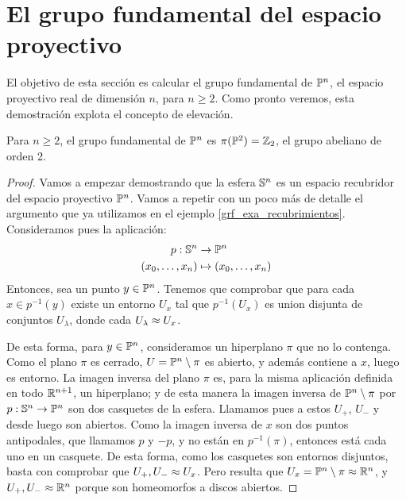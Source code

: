 
\section{El grupo fundamental del espacio proyectivo}

El objetivo de esta sección es calcular el grupo fundamental de $\mathbb{P}^n$, el espacio proyectivo real de dimensión $n$, para $n\geq 2$. Como pronto veremos, esta demostración explota el concepto de elevación. 

\begin{theo}
	\label{grf_espacio_proyectivo}
	
	Para $n\geq 2$, el grupo fundamental de  $\mathbb{P}^n$ es $\pi(\mathbb{P}^2)=\mathbb{Z}_2$, el grupo abeliano de orden 2.
	
	\begin{proof}
		Vamos a empezar demostrando que la esfera $\mathbb{S}^n$ es un espacio recubridor del espacio proyectivo $\mathbb{P}^n$. Vamos a repetir con un poco más de detalle el argumento que ya utilizamos en el ejemplo \ref{grf_exa_recubrimientos}. Consideramos pues la aplicación:
		\[\begin{split}
		p:\mathbb{S}^n&\to\mathbb{P}^n \\
		(x_0,\dots,x_n)&\mapsto (x_0,\dotsc,x_n)
		\end{split}\]
		Entonces, sea un punto $y\in\mathbb{P}^n$. Tenemos que comprobar que para cada $x\in p^{-1}(y)$ existe un entorno $U_x$ tal que $p^{-1}(U_x)$ es union disjunta de conjuntos $U_\lambda$, donde cada $U_\lambda\approx U_x$.
		
		De esta forma, para $y\in\mathbb{P}^n$, consideramos un hiperplano $\pi$ que no lo contenga. Como el plano $\pi$ es cerrado, $U=\mathbb{P}^n\setminus\pi$ es abierto, y además contiene a $x$, luego es entorno. La imagen inversa del plano $\pi$ es, para la misma aplicación definida en todo $\mathbb{R}^{n+1}$, un hiperplano; y de esta manera la imagen inversa de $\mathbb{P}^n\setminus\pi$ por $p:\mathbb{S}^n\to\mathbb{P}^n$ son dos casquetes de la esfera. Llamamos pues a estos $U_+$, $U_-$ y desde luego son abiertos. Como la imagen inversa de $x$ son dos puntos antipodales, que llamamos $p$ y $-p$, y no están en $p^{-1}(\pi)$, entonces está cada uno en un casquete. De esta forma, como los casquetes son entornos disjuntos, basta con comprobar que $U_+,U_-\approx U_x$. Pero resulta que $U_x = \mathbb{P}^n\setminus\pi\approx\mathbb{R}^n$, y $U_+,U_-\approx\mathbb{R}^n$ porque son homeomorfos a discos abiertos.
		

\end{proof}
\end{theo}
